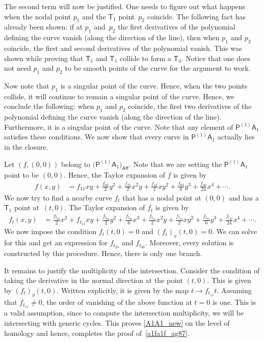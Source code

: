 \documentclass[pdftex]{sigma}
\numberwithin{equation}{section}
\begin{document}
The second term will now be justified. One needs to figure out what happens when the nodal point $p_1$
and the $\mathsf{T}_1$ point~$p_2$ coincide. The following fact has already been shown: if at $p_1$ and~$p_2$
the first derivatives of the polynomial defining the curve vanish (along the direction of the line),
then when $p_1$ and $p_2$ coincide, the first and second derivatives of the polynomial vanish.
This was shown while proving that $\mathsf{T}_1$ and $\mathsf{T}_1$ collide to form a $\mathsf{T}_3$.
Notice that one does not need $p_1$ and $p_2$ to be smooth points of the curve for the argument to work.

Now note that $p_1$ is a singular point of the curve. Hence, when the two points collide, it will continue to
remain a singular point of the curve. Hence, we conclude the following: when $p_1$ and $p_2$ coincide,
the first two derivatives of the polynomial defining the curve
vanish (along the direction of the line). Furthermore, it is a
singular point of the curve. Note that any element of
$\mathsf{P}^{(1)}\mathsf{A}_1$ satisfies these conditions. We now show that every curve in
$\mathsf{P}^{(1)}\mathsf{A}_1$ actually lies in the closure.

Let $(f, (0, 0))$ belong to $\bigl(\mathsf{P}^{(1)}\mathsf{A}_1\bigr)_{\textsf{Aff}}$.
Note that we are setting the $\mathsf{P}^{(1)}\mathsf{A}_1$ point to be $(0,0)$.
Hence, the Taylor expansion of $f$ is given by
\begin{align*}
f(x,y)& = f_{11} xy + \frac{f_{02}}{2} y^2 + \frac{f_{21}}{2} x^2y + \frac{f_{12}}{2} xy^2
+ \frac{f_{03}}{6} y^3 + \frac{f_{40}}{24} x^4 + \cdots.
\end{align*}
We now try to find a nearby curve $f_t$ that has a nodal point at $(0,0)$ and has a $\mathsf{T}_1$ point at~${(t,0)}$.
The Taylor expansion of $f_t$ is given by
\begin{align*}
f_t(x,y)& = \frac{f_{t_{20}}}{2} x^2 + f_{t_{11}} xy + \frac{f_{t_{02}}}{2} y^2 +
\frac{f_{t_{30}}}{6} x^3 + \frac{f_{t_{21}}}{2} x^2y + \frac{f_{t_{12}}}{2} xy^2
+ \frac{f_{t_{03}}}{6} y^3 + \frac{f_{t_{40}}}{24} x^4+ \cdots.
\end{align*}
We now impose the condition $f_t(t,0)=0$ and $(f_{t})_x(t,0) =0$. We can solve for this
and get an expression for $f_{t_{20}}$ and $f_{t_{30}}$. Moreover, every solution is constructed by this
procedure. Hence, there is only one branch.

It remains to justify the multiplicity of the intersection. Consider the condition of taking the derivative in the
normal direction at the point $(t, 0)$. This is given by $(f_{t})_y(t, 0)$. Written explicitly, it is given by the map
$t  \longrightarrow  f_{t_{11}} t$.
Assuming that $f_{t_{11}} \neq 0$, the order of vanishing of the above function at $t = 0$ is one.
This is a valid assumption, since to compute the intersection multiplicity, we will be intersecting with
generic cycles. This proves \eqref{A1A1_new} on the level of homology and hence, completes the proof of~\eqref{a1fa1f_ag87}.
\end{document}
